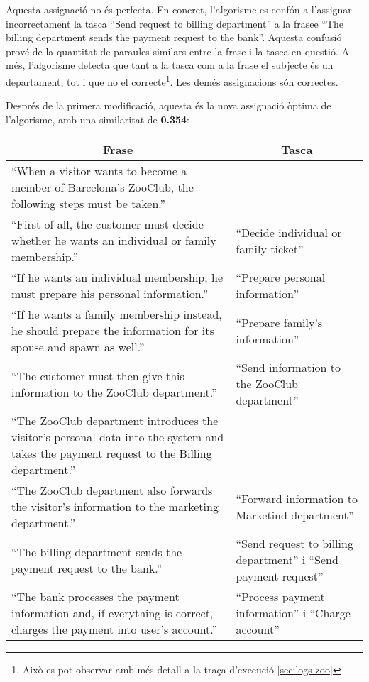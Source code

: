 Aquesta assignació no és perfecta. En concret, l'algorisme es confón a l'assignar incorrectament la tasca ``Send request to billing department'' a la frasee ``The billing department sends the payment request to the bank''. Aquesta confusió prové de la quantitat de paraules similars entre la frase i la tasca en questió. A més, l'algorisme detecta que tant a la tasca com a la frase el subjecte és un departament, tot i que no el correcte\footnote{Això es pot observar amb més detall a la traça d'execució \ref{sec:logs-zoo}}. Les demés assignacions són correctes.

Després de la primera modificació, aquesta és la nova assignació òptima de l'algorisme, amb una similaritat de \textbf{0.354}:

\begin{center}
\begin{tabular}{|p{}|p{}|}
    \hline
    \multicolumn{1}{|c}{\textbf{Frase}} & \multicolumn{1}{|c|}{\textbf{Tasca}} \\ \hline\hline
    ``When a visitor wants to become a member of Barcelona's ZooClub, the following steps must be taken.'' & \\\hline
    ``First of all, the customer must decide whether he wants an individual or family membership.'' & ``Decide individual or family ticket''\\\hline
    ``If he wants an individual membership, he must prepare his personal information.'' & ``Prepare personal information'' \\\hline
    ``If he wants a family membership instead, he should prepare the information for its spouse and spawn as well.'' & ``Prepare family's information'' \\\hline
    ``The customer must then give this information to the ZooClub department.'' & ``Send information to the ZooClub department'' \\\hline
    ``The ZooClub department introduces the visitor's personal data into the system and takes the payment request to the Billing department.'' & \\\hline
    ``The ZooClub department also forwards the visitor's information to the marketing department.'' & ``Forward information to Marketind department'' \\\hline
    ``The billing department sends the payment request to the bank.'' &``Send request to billing department'' i ``Send payment request'' \\\hline
    ``The bank processes the payment information and, if everything is correct, charges the payment into user's account.'' & ``Process payment information'' i  ``Charge account'' \\\hline

\end{tabular}
\end{center}
